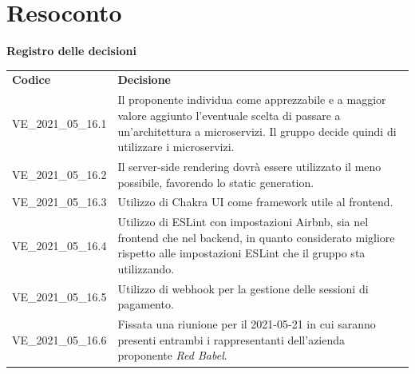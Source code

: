 \documentclass[a4paper]{article}
\begin{document}
\section{Resoconto}
\begin{center}
    \textbf{\Large Registro delle decisioni}\\
    \vspace{10px}
    \begin{table}[h!]
        \centering
        \renewcommand{\arraystretch}{1.8}
        \begin{tabular}{p{200px} p{200px}}
            \rowcolor{logo!70} \textbf{Codice} & \textbf{Decisione}                                                                                                                                                                          \\
            VE\_2021\_05\_16.1                 & Il proponente individua come apprezzabile e a maggior valore aggiunto l'eventuale scelta di passare a un'architettura a microservizi. Il gruppo decide quindi di utilizzare i microservizi. \\
            VE\_2021\_05\_16.2                 & Il server-side rendering dovrà essere utilizzato il meno possibile, favorendo lo static generation.                                                                                         \\
            VE\_2021\_05\_16.3                 & Utilizzo di Chakra UI come framework utile al frontend.                                                                                                                                     \\
            VE\_2021\_05\_16.4                 & Utilizzo di ESLint con impostazioni Airbnb, sia nel frontend che nel backend, in quanto considerato migliore rispetto alle impostazioni ESLint che il gruppo sta utilizzando.               \\
            VE\_2021\_05\_16.5                 & Utilizzo di webhook per la gestione delle sessioni di pagamento.                                                                                                                            \\
            VE\_2021\_05\_16.6                 & Fissata una riunione per il 2021-05-21 in cui saranno presenti entrambi i rappresentanti dell'azienda proponente \textit{Red Babel}.
        \end{tabular}
    \end{table}
\end{center}
\end{document}

